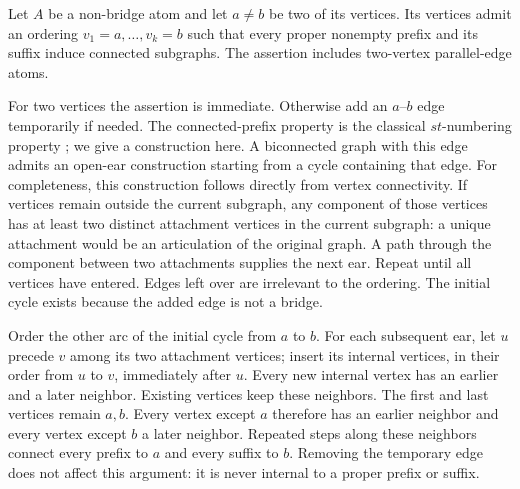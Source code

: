 \begin{lemma}\label{lem:prefixatom}
Let $A$ be a non-bridge atom and let $a\ne b$ be two of its vertices.
Its vertices admit an ordering $v_1=a,\ldots,v_k=b$ such that every
proper nonempty prefix and its suffix induce connected subgraphs.
The assertion includes two-vertex parallel-edge atoms.
\end{lemma}
\begin{pf}
For two vertices the assertion is immediate. Otherwise add an $a$--$b$
edge temporarily if needed. The connected-prefix property is the classical
$st$-numbering property \citep{even1976st}; we give a construction here.
A biconnected graph with this edge admits
an open-ear construction starting from a cycle containing that edge.
For completeness, this construction follows directly from vertex
connectivity. If vertices remain outside the current subgraph, any
component of those vertices has at least two distinct attachment
vertices in the current subgraph: a unique attachment would be an
articulation of the original graph. A path through the component
between two attachments supplies the next ear. Repeat until all
vertices have entered. Edges left over are irrelevant to the ordering.
The initial cycle exists because the added edge is not a bridge.

Order the other arc of the initial cycle from $a$ to $b$. For each
subsequent ear, let $u$ precede $v$ among its two attachment vertices;
insert its internal vertices, in their order from $u$ to $v$,
immediately after $u$. Every new internal vertex has an earlier and a
later neighbor. Existing vertices keep these neighbors. The first and
last vertices remain $a,b$. Every vertex except $a$ therefore has an
earlier neighbor and every vertex except $b$ a later neighbor. Repeated
steps along these neighbors connect every prefix to $a$ and every
suffix to $b$. Removing the temporary edge does not affect this
argument: it is never internal to a proper prefix or suffix.
\end{pf}

